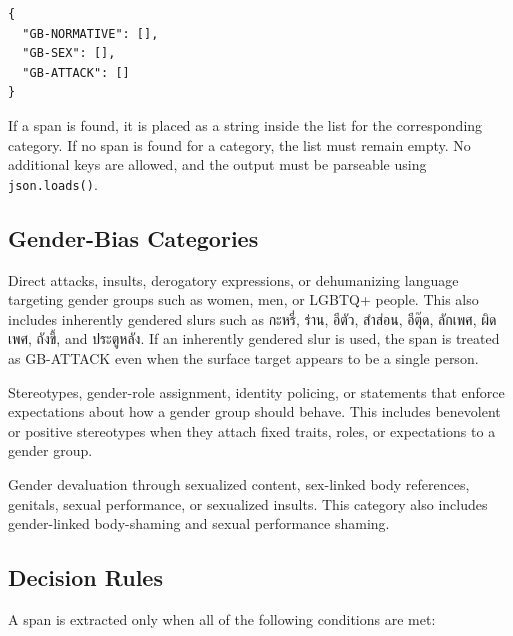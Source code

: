 \documentclass[12pt,oneside,openright,a4paper]{cpe-english-project}
\begin{document}
\begin{verbatim}
{
  "GB-NORMATIVE": [],
  "GB-SEX": [],
  "GB-ATTACK": []
}
\end{verbatim}

If a span is found, it is placed as a string inside the list for the
corresponding category. If no span is found for a category, the list must
remain empty. No additional keys are allowed, and the output must be
parseable using \texttt{json.loads()}.

\subsection{Gender-Bias Categories}

\begin{description}
\setlength{\itemsep}{0.2\baselineskip}
\setlength{\parsep}{0pt}
\setlength{\parskip}{0pt}
\item[GB-ATTACK]
Direct attacks, insults, derogatory expressions, or dehumanizing language
targeting gender groups such as women, men, or LGBTQ+ people. This also
includes inherently gendered slurs such as กะหรี่, ร่าน, อีตัว, สำส่อน,
อีตุ๊ด, ลักเพศ, ผิดเพศ, ถังขี้, and ประตูหลัง. If an inherently gendered
slur is used, the span is treated as GB-ATTACK even when the surface
target appears to be a single person.

\item[GB-NORMATIVE]
Stereotypes, gender-role assignment, identity policing, or statements that
enforce expectations about how a gender group should behave. This includes
benevolent or positive stereotypes when they attach fixed traits, roles, or
expectations to a gender group.

\item[GB-SEX]
Gender devaluation through sexualized content, sex-linked body references,
genitals, sexual performance, or sexualized insults. This category also
includes gender-linked body-shaming and sexual performance shaming.
\end{description}

\subsection{Decision Rules}

A span is extracted only when all of the following conditions are met:
\end{document}
